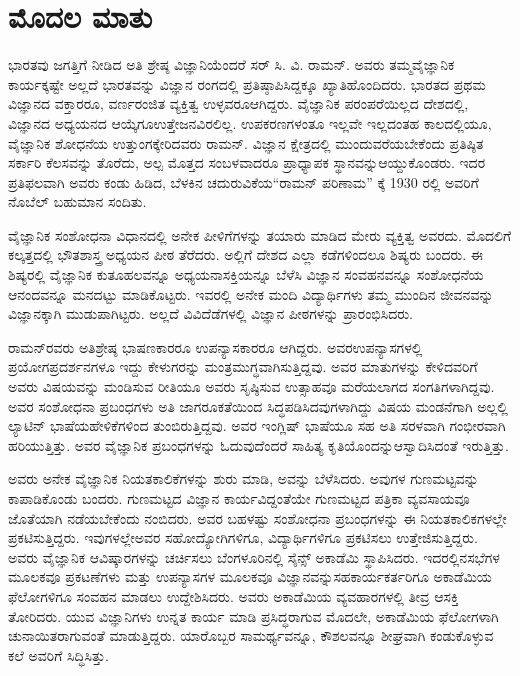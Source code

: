 


\chapter*{ಮೊದಲ ಮಾತು}


ಭಾರತವು ಜಗತ್ತಿಗೆ ನೀಡಿದ ಅತಿ ಶ್ರೇಷ್ಠ ವಿಜ್ಞಾನಿಯೆಂದರೆ ಸರ್ ಸಿ. ವಿ. ರಾಮನ್. ಅವರು ತಮ್ಮ\break ವೈಜ್ಞಾನಿಕ ಕಾರ್ಯಕ್ಕಷ್ಟೇ ಅಲ್ಲದೆ ಭಾರತವನ್ನು ವಿಜ್ಞಾನ ರಂಗದಲ್ಲಿ ಪ್ರತಿಷ್ಠಾಪಿಸಿದ್ದಕ್ಕೂ ಖ್ಯಾತಿ\break ಹೊಂದಿದರು. ಭಾರತದ ಪ್ರಥಮ ವಿಜ್ಞಾನದ ವಕ್ತಾರರೂ, ವರ್ಣರಂಜಿತ ವ್ಯಕ್ತಿತ್ವ ಉಳ್ಳವರೂ\break ಆಗಿದ್ದರು. ವೈಜ್ಞಾನಿಕ ಪರಂಪರೆಯಿಲ್ಲದ ದೇಶದಲ್ಲಿ, ವಿಜ್ಞಾನದ ಅಧ್ಯಯನದ ಆಯ್ಕೆಗೂ\break ಉತ್ತೇಜನವಿರಲಿಲ್ಲ. ಉಪಕರಣಗಳಂತೂ ಇಲ್ಲವೇ ಇಲ್ಲದಂತಹ ಕಾಲದಲ್ಲಿಯೂ, ವೈಜ್ಞಾನಿಕ ಶೋಧನೆಯ ಉತ್ತುಂಗಕ್ಕೇರಿದವರು ರಾಮನ್. ವಿಜ್ಞಾನ ಕ್ಷೇತ್ರದಲ್ಲಿ ಮುಂದುವರೆಯಬೇಕೆಂದು ಪ್ರತಿಷ್ಠಿತ ಸರ್ಕಾರಿ ಕೆಲಸವನ್ನು ತೊರೆದು, ಅಲ್ಪ ಮೊತ್ತದ ಸಂಬಳವಾದರೂ ಪ್ರಾಧ್ಯಾಪಕ ಸ್ಥಾನವನ್ನು\break ಆಯ್ದುಕೊಂಡರು. ಇದರ ಪ್ರತಿಫಲವಾಗಿ ಅವರು ಕಂಡು ಹಿಡಿದ, ಬೆಳಕಿನ ಚದುರುವಿಕೆಯ\break “ರಾಮನ್ ಪರಿಣಾಮ” ಕ್ಕೆ 1930 ರಲ್ಲಿ ಅವರಿಗೆ ನೊಬೆಲ್ ಬಹುಮಾನ ಸಂದಿತು. 

ವೈಜ್ಞಾನಿಕ ಸಂಶೋಧನಾ ವಿಧಾನದಲ್ಲಿ ಅನೇಕ ಪೀಳಿಗೆಗಳನ್ನು ತಯಾರು ಮಾಡಿದ ಮೇರು ವ್ಯಕ್ತಿತ್ವ ಅವರದು. ಮೊದಲಿಗೆ ಕಲ್ಕತ್ತದಲ್ಲಿ ಭೌತಶಾಸ್ತ್ರ ಅಧ್ಯಯನ ಪೀಠ ತೆರೆದರು. ಅಲ್ಲಿಗೆ ದೇಶದ ಎಲ್ಲಾ ಕಡೆಗಳಿಂದಲೂ ಶಿಷ್ಯರು ಬಂದರು. ಈ ಶಿಷ್ಯರಲ್ಲಿ ವೈಜ್ಞಾನಿಕ ಕುತೂಹಲವನ್ನೂ ಅಧ್ಯಯನಾಸಕ್ತಿ\break ಯನ್ನೂ ಬೆಳೆಸಿ ವಿಜ್ಞಾನ ಸಂವಹನವನ್ನೂ ಸಂಶೋಧನೆಯ ಆನಂದವನ್ನೂ ಮನದಟ್ಟು ಮಾಡಿ\break ಕೊಟ್ಟರು. ಇವರಲ್ಲಿ ಅನೇಕ ಮಂದಿ ವಿದ್ಯಾರ್ಥಿಗಳು ತಮ್ಮ ಮುಂದಿನ ಜೀವನವನ್ನು ವಿಜ್ಞಾನಕ್ಕಾಗಿ ಮುಡುಪಾಗಿಟ್ಟರು. ಅಲ್ಲದೆ ವಿವಿದೆಡೆಗಳಲ್ಲಿ ವಿಜ್ಞಾನ ಪೀಠಗಳನ್ನು ಪ್ರಾರಂಭಿಸಿದರು. 

ರಾಮನ್‌ರವರು ಅತಿಶ್ರೇಷ್ಠ ಭಾಷಣಕಾರರೂ ಉಪನ್ಯಾಸಕಾರರೂ ಆಗಿದ್ದರು. ಅವರ\break ಉಪನ್ಯಾಸಗಳಲ್ಲಿ ಪ್ರಯೋಗ\enginline{-}ಪ್ರದರ್ಶನಗಳೂ ಇದ್ದು ಕೇಳುಗರನ್ನು ಮಂತ್ರಮುಗ್ಧವಾಗಿಸುತ್ತಿದ್ದವು. ಅವರ ಮಾತುಗಳನ್ನು ಕೇಳಿದವರಿಗೆ ಅವರು ವಿಷಯವನ್ನು ಮಂಡಿಸುವ ರೀತಿಯೂ ಅವರು ಸೃಷ್ಠಿಸುವ ಉತ್ಸಾಹವೂ ಮರೆಯಲಾಗದ ಸಂಗತಿಗಳಾಗಿದ್ದವು. ಅವರ ಸಂಶೋಧನಾ ಪ್ರಬಂಧಗಳು ಅತಿ ಜಾಗರೂಕತೆಯಿಂದ ಸಿದ್ಧಪಡಿಸಿದವುಗಳಾಗಿದ್ದು ವಿಷಯ ಮಂಡನೆಗಾಗಿ ಅಲ್ಲಲ್ಲಿ ಲ್ಯಾಟಿನ್ ಭಾಷೆಯ\break ಹೇಳಿಕೆಗಳಿಂದ ತುಂಬಿರುತ್ತಿದ್ದವು. ಅವರ ಇಂಗ್ಲಿಷ್ ಭಾಷೆಯೂ ಸಹ ಅತಿ ಸರಳವಾಗಿ ಗಂಭೀರವಾಗಿ ಹರಿಯುತ್ತಿತ್ತು. ಅವರ ವೈಜ್ಞಾನಿಕ ಪ್ರಬಂಧಗಳನ್ನು ಓದುವುದೆಂದರೆ ಸಾಹಿತ್ಯ ಕೃತಿಯೊಂದನ್ನು\break ಆಸ್ವಾದಿಸಿದಂತೆ ಇರುತ್ತಿತ್ತು.


\eject

ಅವರು ಅನೇಕ ವೈಜ್ಞಾನಿಕ ನಿಯತಕಾಲಿಕೆಗಳನ್ನು ಶುರು ಮಾಡಿ, ಅವನ್ನು ಬೆಳೆಸಿದರು. ಅವುಗಳ ಗುಣಮಟ್ಟವನ್ನು ಕಾಪಾಡಿಕೊಂಡು ಬಂದರು. ಗುಣಮಟ್ಟದ ವಿಜ್ಞಾನ ಕಾರ್ಯವಿದ್ದಂತೆಯೇ ಗುಣಮಟ್ಟದ ಪತ್ರಿಕಾ ವ್ಯವಸಾಯವೂ ಜೊತೆಯಾಗಿ ನಡೆಯಬೇಕೆಂದು ನಂಬಿದರು. ಅವರ ಬಹಳಷ್ಟು ಸಂಶೋಧನಾ ಪ್ರಬಂಧಗಳನ್ನು ಈ ನಿಯತಕಾಲಿಕಗಳಲ್ಲೇ ಪ್ರಕಟಿಸುತ್ತಿದ್ದರು. ಇವುಗಳಲ್ಲೇ\break ಅವರ ಸಹೋದ್ಯೋಗಿಗಳಿಗೂ, ವಿದ್ಯಾರ್ಥಿಗಳಿಗೂ ಪ್ರಕಟಿಸಲು ಉತ್ತೇಜಿಸುತ್ತಿದ್ದರು. ಅವರು ವೈಜ್ಞಾನಿಕ ಆವಿಷ್ಕಾರಗಳನ್ನು ಚರ್ಚಿಸಲು ಬೆಂಗಳೂರಿನಲ್ಲಿ ಸೈನ್ಸ್ ಅಕಾಡೆಮಿ ಸ್ಥಾಪಿಸಿದರು. ಇದರಲ್ಲಿನ\break ಸಭೆಗಳ ಮೂಲಕವೂ ಪ್ರಕಟಣೆಗಳು ಮತ್ತು ಉಪನ್ಯಾಸಗಳ ಮೂಲಕವೂ ವಿಜ್ಞಾನವನ್ನು\break ಸಹಕಾರ್ಯಕರ್ತರಿಗೂ ಅಕಾಡೆಮಿಯ ಫೆಲೋಗಳಿಗೂ ಸಂವಹನ ಮಾಡಲು ಉದ್ದೇಶಿಸಿದರು. ಅವರು ಅಕಾಡೆಮಿಯ ವ್ಯವಹಾರಗಳಲ್ಲಿ ತೀವ್ರ ಆಸಕ್ತಿ ತೋರಿದರು. ಯುವ ವಿಜ್ಞಾನಿಗಳು ಉನ್ನತ ಕಾರ್ಯ ಮಾಡಿ ಪ್ರಸಿದ್ಧರಾಗುವ ಮೊದಲೇ, ಅಕಾಡೆಮಿಯ ಫೆಲೋಗಳಾಗಿ ಚುನಾಯಿತರಾಗುವಂತೆ ಮಾಡುತ್ತಿದ್ದರು. ಯಾರೊಬ್ಬರ ಸಾಮರ್ಥ್ಯವನ್ನೂ, ಕೌಶಲವನ್ನೂ ಶೀಘ್ರವಾಗಿ ಕಂಡುಕೊಳ್ಳುವ ಕಲೆ ಅವರಿಗೆ ಸಿದ್ಧಿಸಿತ್ತು.


